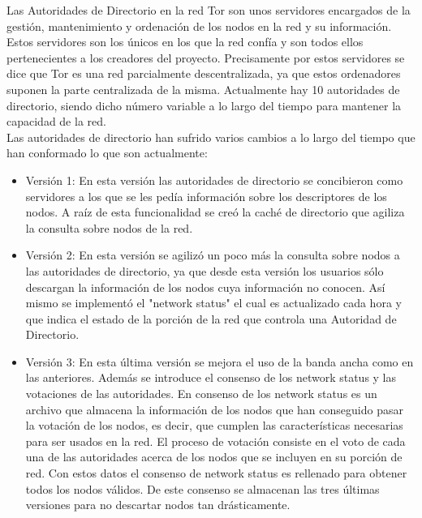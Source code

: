 Las Autoridades de Directorio en la red Tor son unos servidores encargados de la gestión, mantenimiento y ordenación de los nodos en la red y su información. Estos servidores son los únicos en los que la red confía y son todos ellos pertenecientes a los creadores del proyecto. Precisamente por estos servidores se dice que Tor es una red parcialmente descentralizada, ya que estos ordenadores suponen la parte centralizada de la misma. Actualmente hay 10 autoridades de directorio, siendo dicho número variable a lo largo del tiempo para mantener la capacidad de la red.\\
Las autoridades de directorio han sufrido varios cambios a lo largo del tiempo que han conformado lo que son actualmente:
\begin{itemize}
	\item Versión 1:
		En esta versión las autoridades de directorio se concibieron como servidores a los que se les pedía información sobre los descriptores de los nodos. A raíz de esta funcionalidad se creó la caché de directorio que agiliza la consulta sobre nodos de la red.
	\item Versión 2:
		En esta versión se agilizó un poco más la consulta sobre nodos a las autoridades de directorio, ya que desde esta versión los usuarios sólo descargan la información de los nodos cuya información no conocen. Así mismo se implementó el "network status" el cual es actualizado cada hora y que indica el estado de la porción de la red que controla una Autoridad de Directorio.
	\item Versión 3:
		En esta última versión se mejora el uso de la banda ancha como en las anteriores. Además se introduce el consenso de los network status y las votaciones de las autoridades. En consenso de los network status es un archivo que almacena la información de los nodos que han conseguido pasar la votación de los nodos, es decir, que cumplen las características necesarias para ser usados en la red. El proceso de votación consiste en el voto de cada una de las autoridades acerca de los nodos que se incluyen en su porción de red. Con estos datos el consenso de network status es rellenado para obtener todos los nodos válidos. De este consenso se almacenan las tres últimas versiones para no descartar nodos tan drásticamente.
\end{itemize}
